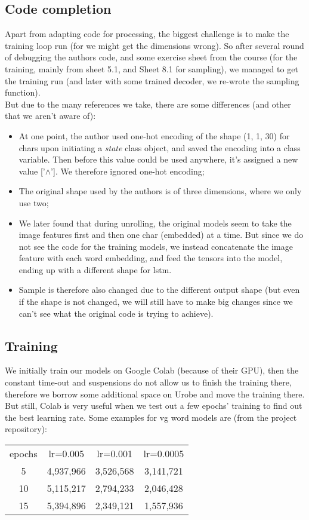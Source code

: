 \documentclass[a4paper]{scrartcl}
\begin{document}
\subsection*{Code completion}
Apart from adapting code for processing, the biggest challenge is to make the training loop run (for we might get the dimensions wrong). So after several round of debugging the authors code, and some exercise sheet from the course (for the training, mainly from sheet 5.1, and Sheet 8.1 for sampling), we managed to get the training run (and later with some trained decoder, we re-wrote the sampling function). \\
But due to the many references we take, there are some differences (and other that we aren't aware of): 
\begin{itemize}
  \item At one point, the author used one-hot encoding of the shape (1, 1, 30) for chars upon initiating a \emph{state} class object, and saved the encoding into a class variable. Then before this value could be used anywhere, it's assigned a new value ['$\land$']. We therefore ignored one-hot encoding;
  \item The original shape used by the authors is of three dimensions, where we only use two;
  \item We later found that during unrolling, the original models seem to take the image features first and then one char (embedded) at a time. But since we do not see the code for the training models, we instead concatenate the image feature with each word embedding, and feed the tensors into the model, ending up with a different shape for lstm.  
  \item Sample is therefore also changed due to the different output shape (but even if the shape is not changed, we will still have to make big changes since we can't see what the original code is trying to achieve). 
\end{itemize}

\subsection*{Training}
We initially train our models on Google Colab (because of their GPU), then the constant time-out and suspensions do not allow us to finish the training there, therefore we borrow some additional space on Urobe and move the training there. But still, Colab is very useful when we test out a few epochs' training to find out the best learning rate. Some examples for vg word models are (from the project repository):
\begin{center}
\begin{tabular}{ c c c c }
 epochs &  lr=0.005 & lr=0.001 & lr=0.0005\\ 
 5 & 4,937,966 & 3,526,568 & 3,141,721\\  
 10 & 5,115,217 & 2,794,233 & 2,046,428\\  
 15 & 5,394,896 & 2,349,121 & 1,557,936\\
\end{tabular}
\end{center}
\end{document}
